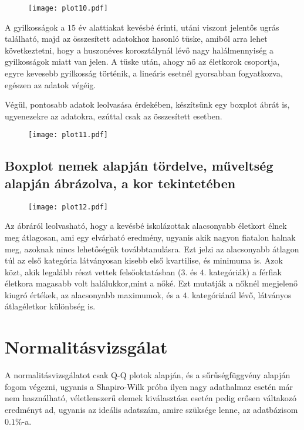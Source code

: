 \documentclass{article}
\begin{document}
\begin{minipage}{0.5\textwidth}
\begin{figure}[H]
\texttt{[image: plot10.pdf]}
\end{figure}
\end{minipage} \hfill
\begin{minipage}{0.45\textwidth}
A gyilkosságok a $15$ év alattiakat kevésbé érinti, utáni viszont jelentős ugrás található, majd az összesített adatokhoz hasonló tüske, amiből arra lehet következtetni, hogy a huszonéves korosztálynál lévő nagy halálmennyiség a gyilkosságok miatt van jelen. A tüske után, ahogy nő az életkorok csoportja, egyre kevesebb gyilkosság történik, a lineáris esetnél gyorsabban fogyatkozva, egészen az adatok végéig.
\end{minipage}

Végül, pontosabb adatok leolvasása érdekében, készítsünk egy boxplot ábrát is, ugyenezekre az adatokra, ezúttal csak az összesített esetben.

\begin{figure}[h]
\centering
\texttt{[image: plot11.pdf]}
\end{figure}


\subsection{Boxplot nemek alapján tördelve, műveltség alapján ábrázolva, a kor tekintetében}

\begin{figure}[h]
\centering
\texttt{[image: plot12.pdf]}
\end{figure}
Az ábráról leolvasható, hogy a kevésbé iskolázottak alacsonyabb életkort élnek meg átlagosan, ami egy elvárható eredmény, ugyanis akik nagyon fiatalon halnak meg, azoknak nincs lehetőségük továbbtanulásra. Ezt jelzi az alacsonyabb átlagon túl az első kategória látványosan kisebb első kvartilise, és minimuma is. Azok közt, akik legalább részt vettek felsőoktatásban ($3.$ és $4.$ kategóriák) a férfiak életkora magasabb volt halálukkor,mint a nőké. Ezt mutatják a nőknél megjelenő kiugró értékek, az alacsonyabb maximumok, és a $4.$ kategóriánál lévő, látványos átlagéletkor különbség is.

\section{Normalitásvizsgálat}

A normalitásvizsgálatot csak Q-Q plotok alapján, és a sűrűségfüggvény alapján fogom végezni, ugyanis a Shapiro-Wilk próba ilyen nagy adathalmaz esetén már nem használható, véletlenszerű elemek kiválasztása esetén pedig erősen váltakozó eredményt ad, ugyanis az ideális adatszám, amire szüksége lenne, az adatbázisom $0.1\%$-a.
\end{document}
